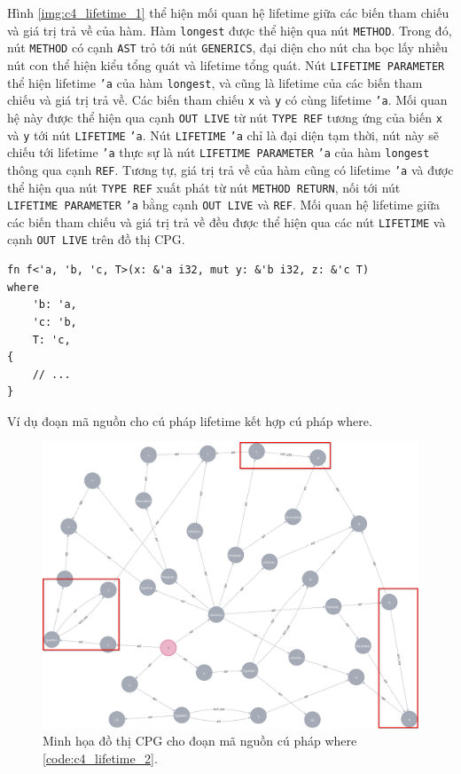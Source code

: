 Hình \ref{img:c4_lifetime_1} thể hiện mối quan hệ lifetime giữa các biến tham chiếu và giá trị trả về của hàm.
Hàm \texttt{longest} được thể hiện qua nút \texttt{METHOD}.
Trong đó, nút \texttt{METHOD} có cạnh \texttt{AST} trỏ tới nút \texttt{GENERICS}, đại diện cho nút cha bọc lấy nhiều nút con thể hiện kiểu tổng quát và lifetime tổng quát.
Nút \texttt{LIFETIME PARAMETER} thể hiện lifetime \texttt{'a} của hàm \texttt{longest}, và cũng là lifetime của các biến tham chiếu và giá trị trả về.
Các biến tham chiếu \texttt{x} và \texttt{y} có cùng lifetime \texttt{'a}.
Mối quan hệ này được thể hiện qua cạnh \texttt{OUT LIVE} từ nút \texttt{TYPE REF} tương ứng của biến \texttt{x} và \texttt{y} tới nút \texttt{LIFETIME} \texttt{'a}.
Nút \texttt{LIFETIME} \texttt{'a} chỉ là đại diện tạm thời, nút này sẽ chiếu tới lifetime \texttt{'a} thực sự là nút \texttt{LIFETIME PARAMETER} \texttt{'a} của hàm \texttt{longest} thông qua cạnh \texttt{REF}.
Tương tự, giá trị trả về của hàm cũng có lifetime \texttt{'a} và được thể hiện qua nút \texttt{TYPE REF} xuất phát từ nút \texttt{METHOD RETURN}, nối tới nút \texttt{LIFETIME PARAMETER} \texttt{'a} bằng cạnh \texttt{OUT LIVE} và \texttt{REF}.
Mối quan hệ lifetime giữa các biến tham chiếu và giá trị trả về đều được thể hiện qua các nút \texttt{LIFETIME} và cạnh \texttt{OUT LIVE} trên đồ thị CPG.

\begin{listing}[H]
\begin{verbatim}
fn f<'a, 'b, 'c, T>(x: &'a i32, mut y: &'b i32, z: &'c T)
where
    'b: 'a,
    'c: 'b,
    T: 'c,
{
    // ...
}
\end{verbatim}
\caption{Ví dụ đoạn mã nguồn cho cú pháp lifetime kết hợp cú pháp where.}
\label{code:c4_lifetime_2}
\end{listing}


\begin{figure}[H]
    \includegraphics[width=1\columnwidth]{figures/c4.highlight/c4_lifetime_2_high.png}
    \centering
    \caption{Minh họa đồ thị CPG cho đoạn mã nguồn cú pháp where \ref{code:c4_lifetime_2}.}
    \label{img:c4_lifetime_2}
\end{figure}

